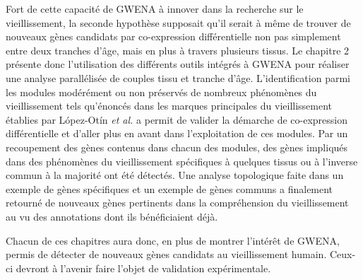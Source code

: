Fort de cette capacité de GWENA à innover dans la recherche sur le vieillissement, la seconde hypothèse supposait qu'il serait à même de trouver de nouveaux gènes candidats par co-expression différentielle non pas simplement entre deux tranches d'âge, mais en plus à travers plusieurs tissus. Le chapitre 2 présente donc l'utilisation des différents outils intégrés à GWENA pour réaliser une analyse parallélisée de couples tissu et tranche d'âge. L'identification parmi les modules modérément ou non préservés de nombreux phénomènes du vieillissement tels qu'énoncés dans les marques principales du vieillissement établies par López-Otín \textit{et al.} a permit de valider la démarche de co-expression différentielle et d'aller plus en avant dans l'exploitation de ces modules. Par un recoupement des gènes contenus dans chacun des modules, des gènes impliqués dans des phénomènes du vieillissement spécifiques à quelques tissus ou à l'inverse commun à la majorité ont été détectés. Une analyse topologique faite dans un exemple de gènes spécifiques et un exemple de gènes communs a finalement retourné de nouveaux gènes pertinents dans la compréhension du vieillissement au vu des annotations dont ils bénéficiaient déjà.

Chacun de ces chapitres aura donc, en plus de montrer l'intérêt de GWENA, permis de détecter de nouveaux gènes candidats au vieillissement humain. Ceux-ci devront à l'avenir faire l'objet de validation expérimentale.

